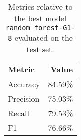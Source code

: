 \begin{table}[H]
\centering
\begin{tabularx}{0.48\textwidth}{|X|r|}
\hline
Metric & Value \\
\hline
Accuracy & 84.59\% \\
Precision & 75.03\% \\
Recall & 79.53\% \\
F1 & 76.66\% \\
\hline
\end{tabularx}
\caption{Metrics relative to the best model \texttt{random\_forest-G1-8} evaluated on the test set.}
\label{tab:best_model_metrics_test}

\end{table}

